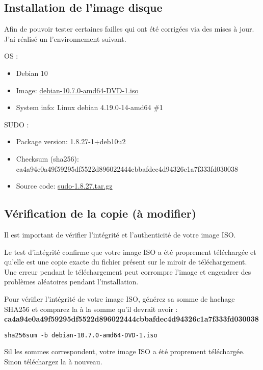 \documentclass[a4paper, 12pt]{article}
\begin{document}
    \subsection{Installation de l'image disque}
    \begin{flushleft}
       \noindent Afin de pouvoir tester certaines failles qui ont été corrigées via des mises à jour. J'ai réalisé un l'environnement suivant. 
       \item OS : 
       \begin{itemize}
           \item  Debian 10
           \item Image: \href{https://cdimage.debian.org/mirror/cdimage/archive/10.7.0/amd64/iso-dvd/debian-10.7.0-amd64-DVD-1.iso}{debian-10.7.0-amd64-DVD-1.iso } \cite{CVE2021350:online}
           \item System info: Linux debian 4.19.0-14-amd64 \#1
       \end{itemize}
       \item SUDO : 
       \begin{itemize}
           \item Package version: 1.8.27-1+deb10u2
           \item Checksum (sha256): ca4a94e0a49f59295df5522d896022444cbbafdec4d94326c1a7f333fd030038
           \item Source code: \href{https://www.sudo.ws/dist/sudo-1.8.27.tar.gz}{sudo-1.8.27.tar.gz} \cite{CVE2021350:online}
       \end{itemize}

       \subsection{Vérification de la copie (à modifier)}
       \item Il est important de vérifier l’intégrité et l’authenticité de votre image ISO.
       \item Le test d’intégrité confirme que votre image ISO a été proprement téléchargée et qu’elle est une copie exacte du fichier présent sur le miroir de téléchargement. Une erreur pendant le téléchargement peut corrompre l’image et engendrer des problèmes aléatoires pendant l’installation.
       \item Pour vérifier l’intégrité de votre image ISO, générez sa somme de hachage SHA256 et comparez la à la somme qu'il devrait avoir : \textbf{ca4a94e0a49f59295df5522d896022444cbbafdec4d94326c1a7f333fd030038}
        \begin{lstlisting}
sha256sum -b debian-10.7.0-amd64-DVD-1.iso
        \end{lstlisting}
        \item Sil les sommes correspondent, votre image ISO a été proprement téléchargée. Sinon téléchargez la à nouveau. 
       

\end{flushleft}
\end{document}
